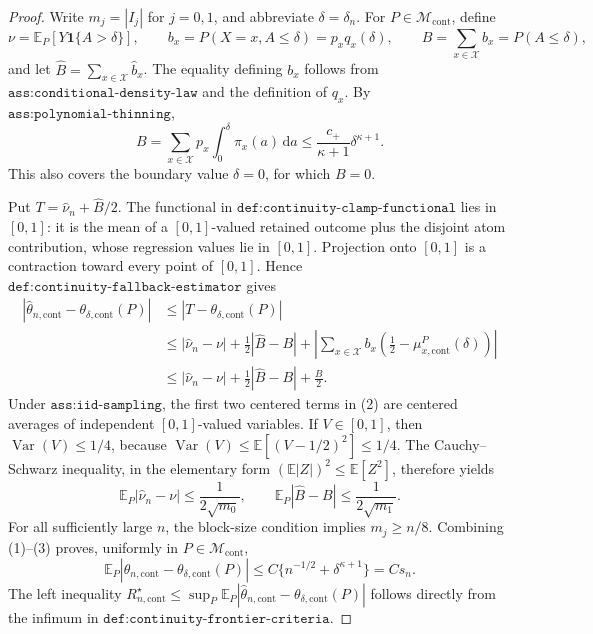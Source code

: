 \documentclass{article}
\begin{document}
\begin{proof}
Write \(m_j=|I_j|\) for \(j=0,1\), and abbreviate \(\delta=\delta_n\).  For \(P\in\mathcal M_{\mathrm{cont}}\), define
\[
 \nu=\mathbb E_P[Y\mathbf 1\{A>\delta\}],\qquad
 b_x=P(X=x,A\leq\delta)=p_xq_x(\delta),\qquad
 B=\sum_{x\in\mathcal X}b_x=P(A\leq\delta),
\]
and let \(\widehat B=\sum_{x\in\mathcal X}\widehat b_x\).  The equality defining \(b_x\) follows from \(\texttt{ass:conditional-density-law}\) and the definition of \(q_x\).  By \(\texttt{ass:polynomial-thinning}\),
\[
 B=\sum_{x\in\mathcal X}p_x\int_0^\delta\pi_x(a)\,\mathrm da
 \leq \frac{c_+}{\kappa+1}\delta^{\kappa+1}. \tag{1}
\]
This also covers the boundary value \(\delta=0\), for which \(B=0\).

Put \(T=\widehat\nu_n+\widehat B/2\).  The functional in \(\texttt{def:continuity-clamp-functional}\) lies in \([0,1]\): it is the mean of a \([0,1]\)-valued retained outcome plus the disjoint atom contribution, whose regression values lie in \([0,1]\).  Projection onto \([0,1]\) is a contraction toward every point of \([0,1]\).  Hence \(\texttt{def:continuity-fallback-estimator}\) gives
\[
\begin{aligned}
 |\widehat\theta_{n,\mathrm{cont}}-\theta_{\delta,\mathrm{cont}}(P)|
 &\leq |T-\theta_{\delta,\mathrm{cont}}(P)|\\
 &\leq |\widehat\nu_n-\nu|+\frac12|\widehat B-B|
   +\left|\sum_{x\in\mathcal X}b_x
       \left(\frac12-\mu_{x,\mathrm{cont}}^P(\delta)\right)\right|\\
 &\leq |\widehat\nu_n-\nu|+\frac12|\widehat B-B|+\frac B2.
\end{aligned}\tag{2}
\]
Under \(\texttt{ass:iid-sampling}\), the first two centered terms in (2) are centered averages of independent \([0,1]\)-valued variables.  If \(V\in[0,1]\), then \(\operatorname{Var}(V)\leq1/4\), because \(\operatorname{Var}(V)\leq\mathbb E[(V-1/2)^2]\leq1/4\).  The Cauchy--Schwarz inequality, in the elementary form \((\mathbb E|Z|)^2\leq\mathbb E[Z^2]\), therefore yields
\[
 \mathbb E_P|\widehat\nu_n-\nu|\leq\frac1{2\sqrt{m_0}},
 \qquad
 \mathbb E_P|\widehat B-B|\leq\frac1{2\sqrt{m_1}}. \tag{3}
\]
For all sufficiently large \(n\), the block-size condition implies \(m_j\geq n/8\).  Combining (1)--(3) proves, uniformly in \(P\in\mathcal M_{\mathrm{cont}}\),
\[
 \mathbb E_P|\widehat\theta_{n,\mathrm{cont}}-
       \theta_{\delta,
       \mathrm{cont}}(P)|
 \leq C\{n^{-1/2}+\delta^{\kappa+1}\}=Cs_n. \tag{4}
\]
The left inequality \(R_{n,\mathrm{cont}}^\star\leq
\sup_P\mathbb E_P|\widehat\theta_{n,\mathrm{cont}}-
\theta_{\delta,\mathrm{cont}}(P)|\) follows directly from the infimum in \(\texttt{def:continuity-frontier-criteria}\).


\end{proof}
\end{document}
